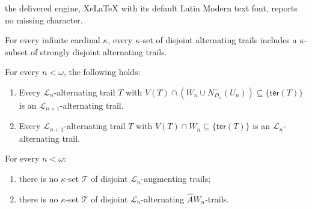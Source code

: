 \documentclass[10pt,a4paper]{amsart}
\begin{document}
the delivered engine, XeLaTeX with its default Latin Modern text font, reports no missing character.
\begin{observation}\label{obs: dis to strongly dis}
For every infinite cardinal $ \kappa $, every $ \kappa $-set of disjoint alternating trails includes a $ \kappa $-subset of 
strongly 
disjoint alternating trails.
\end{observation}

\begin{lemma}\label{lem: remains alternating trail}
For every $ n<\omega $, the following holds:
\begin{enumerate}
\item Every $ \mathcal{L}_{n} $-alternating trail $ T $ with 
$ V(T)\cap (W_n \cup N_{D_{n}}^{-}(U_n))\subseteq \{ \mathsf{ter}(T) \} $ is an $ \mathcal{L}_{n+1} $-alternating 
trail.
\item Every $ \mathcal{L}_{n+1} $-alternating trail $ T $ with $ V(T)\cap W_n \subseteq \{ \mathsf{ter}(T) \} $ is an $ 
\mathcal{L}_n $-alternating trail.
\end{enumerate}
\end{lemma}

\begin{lemma}\label{lem: key lemma}
For every $ n<\omega $:
\begin{enumerate}[label=(\roman*)]
\item[$ (i_n) $]\label{item: no kappa aug} there is no $ \kappa $-set $ \mathcal{T} $ of disjoint $ \mathcal{L}_n $-augmenting trails;
\item[$ (ii_n) $]\label{item: few meets Wn} there is no $ \kappa $-set $ \mathcal{T} $ of disjoint $ \mathcal{L}_n 
$-alternating $ \widehat{A}W_n$-trails.
\end{enumerate}
\end{lemma}
\end{document}
